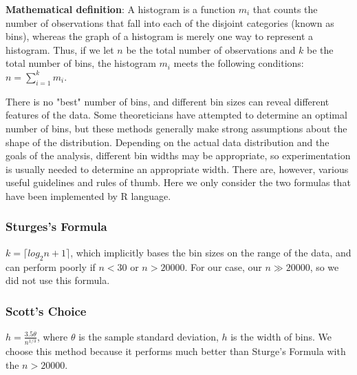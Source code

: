 \documentclass[times, 10pt,onecolumn]{article} %
\begin{document}
\textbf{Mathematical definition}: A histogram is a function $m_i$ that counts the number of observations that fall into each of the disjoint categories (known as bins), whereas the graph of a histogram is merely one way to represent a histogram. Thus, if we let $n$ be the total number of observations and $k$ be the total number of bins, the histogram $m_i$ meets the following conditions: $n = \sum^k_{i=1}m_i$. 

There is no "best" number of bins, and different bin sizes can reveal different features of the data. Some theoreticians have attempted to determine an optimal number of bins, but these methods generally make strong assumptions about the shape of the distribution. Depending on the actual data distribution and the goals of the analysis, different bin widths may be appropriate, so experimentation is usually needed to determine an appropriate width. There are, however, various useful guidelines and rules of thumb. \cite{DenEst}  Here we only consider the two formulas that have been implemented by R language.

\subsubsection{Sturges's Formula}
$k=\lceil log_2n + 1\rceil$, which implicitly bases the bin sizes on the range of the data, and can perform poorly if $n < 30$ or $ n>20000$\cite{stu}. For our case, our $n \gg 20000$, so we did not use this formula.

\subsubsection{Scott's Choice}
$h =\frac{3.5 \theta}{n^{1/3}}$, where $\theta$ is the sample standard deviation, $h$ is the width of bins\cite{sco}. We choose this method because it performs much better than Sturge's Formula with the $n > 20000$.
\end{document}
